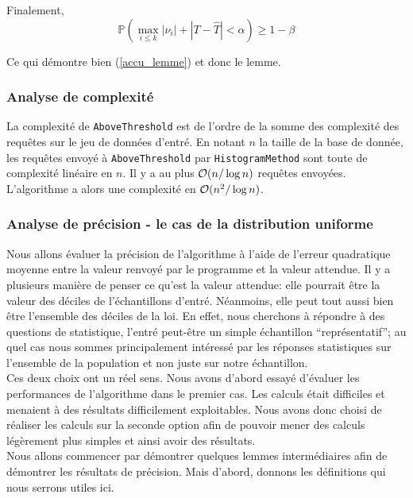 Finalement, 
\[
    \mathbb P\left( \max_{i \leq k} |\nu_i| + |T - \hat T| < \alpha  \right)  \geq 1 - \beta
\]

Ce qui démontre bien (\ref{accu_lemme}) et donc le lemme.\\

\subsubsection{Analyse de complexité}

La complexité de \texttt{AboveThreshold} est de l'ordre de la somme des complexité des requêtes sur le jeu de données d'entré. En notant \(n\) la taille de la base de donnée, les requêtes envoyé à \texttt{AboveThreshold} par \texttt{HistogramMethod} sont toute de complexité linéaire en \(n\). Il y a au plus \(\mathcal{O}(n/\log n)\) requêtes envoyées. L'algorithme a alors une complexité en \(\mathcal{O}(n^2/\log n)\).

\subsubsection{Analyse de précision - le cas de la distribution uniforme}

Nous allons évaluer la précision de l'algorithme à l'aide de l'erreur quadratique moyenne entre la valeur renvoyé par le programme et la valeur attendue. Il y a plusieurs manière de penser ce qu'est la valeur attendue: elle pourrait être la valeur des déciles de l'échantillons d'entré. Néanmoins, elle peut tout aussi bien être l'ensemble des déciles de la loi. En effet, nous cherchons à répondre à des questions de statistique, l'entré peut-être un simple échantillon ``représentatif'';  au quel cas nous sommes principalement intéressé par les réponses statistiques sur l'ensemble de la population et non juste sur notre échantillon.\\

Ces deux choix ont un réel sens. Nous avons d'abord essayé d'évaluer les performances de l'algorithme dans le premier cas. Les calculs était difficiles et menaient à des résultats difficilement exploitables. Nous avons donc choisi de réaliser les calculs sur la seconde option afin de pouvoir mener des calculs légèrement plus simples et ainsi avoir des résultats.\\

Nous allons commencer par démontrer quelques lemmes intermédiaires afin de démontrer les résultats de précision. Mais d'abord, donnons les définitions qui nous serrons utiles ici.\\

